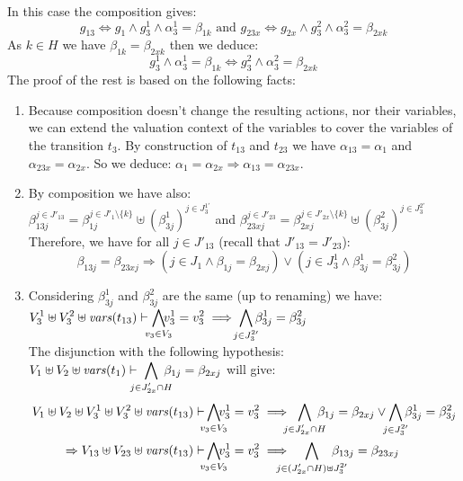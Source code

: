 \documentclass[runningheads]{llncs}
\begin{document}
\begin{enumerate}
In this case the composition gives: \[g_{13} \Leftrightarrow g_1 \wedge g^1_3 \wedge \alpha^1_3=\beta_{1k} \text{ and }
g_{23x}  \Leftrightarrow g_{2x} \wedge g^2_3 \wedge \alpha^2_3=\beta_{2xk}\]
As $k \in H$ we have   
$\beta_{1k} = \beta_{2xk}$ then we  deduce:
\[g^1_3 \wedge \alpha^1_3=\beta_{1k}  \Leftrightarrow g^2_3 \wedge \alpha^2_3= \beta_{2xk}\]
The proof of the rest  is based on the following facts: 
\begin{enumerate}
\item  Because composition doesn't change the resulting actions, nor their variables, we can extend the valuation context of the variables to cover the variables of the transition $t_3$.   By construction of  $t_{13}$ and $t_{23}$ we have $\alpha_{13}=
\alpha_{1}$ and $\alpha_{23x}=\alpha_{2x}$. So we deduce: 
$\alpha_{1} = \alpha_{2x} \Rightarrow \alpha_{13} = \alpha_{23x}$.
\item By composition we have also: \\ $\beta_{13j}^{j\in J'_{13}}= \beta_{1j}^{j \in J'_{1}  \setminus \{k\}} \uplus   {(\beta^1_{3j})^{j \in J^{1 \prime}_3} }$
and $\beta_{23xj}^{j\in J'_{23}}= \beta_{2xj}^{j \in J'_{2x}  \setminus \{k\}} \uplus   {(\beta^2_{3j})^{j \in J^{2 \prime}_3} }$\\
Therefore, we have for all $j\in J'_{13}$ (recall that $J'_{13}=J'_{23}$):  \[\beta_{13j} = \beta_{23xj} \Rightarrow (j\in J_1 \land \beta_{1j} = \beta_{2xj}) \vee (j\in J_3^1 \land \beta^1_{3j}= \beta^2_{3j})\]
\item 
Considering $\beta^1_{3j}$ and  $\beta^2_{3j}$  are the same (up to renaming)  we have: \\
${\displaystyle V^1_{3} \uplus V^2_{3} \uplus \fvars{t_{13}} \vdash \bigwedge_\subbox{v_3\in V_3}\!\! v^1_3=v^2_3\implies \bigwedge_\subbox{j \in J^{2 \prime}_3} \beta^1_{3j}= \beta^2_{3j}}$\\
The disjunction with the following hypothesis:\\ $V_{1} \uplus V_{2} \uplus \fvars{t_1}  \vdash {\displaystyle \bigwedge_\subbox{j \in J'_{2x} \cap H} \beta_{1j} = \beta_{2xj}}$  will give:
\begin{align*}
 V_{1} \uplus V_{2}  \uplus V^1_{3} \uplus V^2_{3} \uplus \fvars{t_{13}}\vdash &    \bigwedge_\subbox{v_3\in V_3}\!\! v^1_3=v^2_3 \implies {\displaystyle \bigwedge_\subbox{j \in J'_{2x} \cap H} \beta_{1j} = \beta_{2xj}} \vee {\displaystyle \bigwedge_\subbox{j \in J^{2 \prime}_3} \beta^1_{3j}= \beta^2_{3j}}\\
\Rightarrow  V_{13} \uplus V_{23}  \uplus \fvars{t_{13}}\vdash & \bigwedge_\subbox{v_3\in V_3}\!\! v^1_3=v^2_3\implies {\displaystyle \bigwedge_\subbox{j \in (J'_{2x}   \cap H)\uplus J^{2 \prime}_3 } \beta_{13j} = \beta_{23xj}} \\  

\end{align*}
\end{enumerate}
\end{enumerate}
\end{document}
